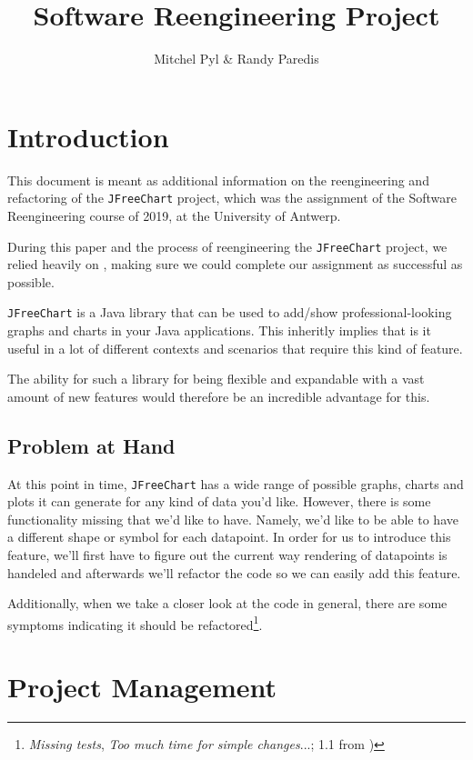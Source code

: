 \documentclass[11pt]{article}
\begin{document}
	\title{Software Reengineering Project}
	\author{Mitchel Pyl \& Randy Paredis}
	\date{}
	
	\maketitle
	
	\section{Introduction}
	This document is meant as additional information on the reengineering and refactoring of the \texttt{JFreeChart} project, which was the assignment of the \textsf{Software Reengineering} course of 2019, at the \textsf{University of Antwerp}.
	
	During this paper and the process of reengineering the \texttt{JFreeChart} project, we relied heavily on \cite{demeyer2009object}, making sure we could complete our assignment as successful as possible.
	
	\texttt{JFreeChart} \cite{jfreechart} is a Java library that can be used to add/show professional-looking graphs and charts in your Java applications. This inheritly implies that is it useful in a lot of different contexts and scenarios that require this kind of feature.
	
	The ability for such a library for being flexible and expandable with a vast amount of new features would therefore be an incredible advantage for this.
	
	\subsection{Problem at Hand}
	At this point in time, \texttt{JFreeChart} has a wide range of possible graphs, charts and plots it can generate for any kind of data you'd like. However, there is some functionality missing that we'd like to have. Namely, we'd like to be able to have a different shape or symbol for each datapoint. In order for us to introduce this feature, we'll first have to figure out the current way rendering of datapoints is handeled and afterwards we'll refactor the code so we can easily add this feature.
	
	Additionally, when we take a closer look at the code in general, there are some symptoms indicating it should be refactored\footnote{\textit{Missing tests}, \textit{Too much time for simple changes}...; 1.1 from \cite{demeyer2009object})}.
	
	\section{Project Management}
\end{document}

